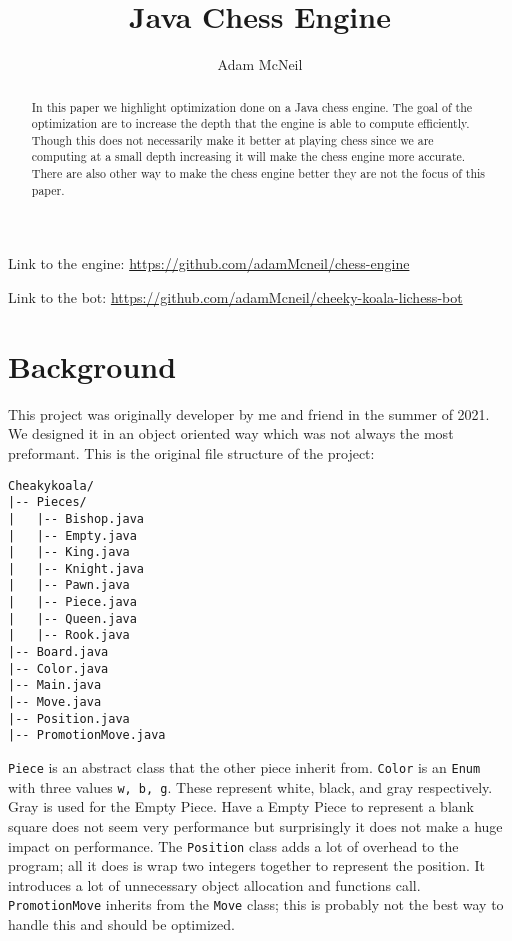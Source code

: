 \documentclass[sigconf]{acmart}
\begin{document}
\title{Java Chess Engine}

\author{Adam McNeil}


\begin{abstract}
In this paper we highlight optimization done on a Java chess engine.
The goal of the optimization are to increase the depth that the engine is able to compute efficiently.
Though this does not necessarily make it better at playing chess since we are computing at a small depth increasing it will make the chess engine more accurate.
There are also other way to make the chess engine better they are not the focus of this paper.
\end{abstract}

\maketitle
Link to the engine: \url{https://github.com/adamMcneil/chess-engine}

Link to the bot: \url{https://github.com/adamMcneil/cheeky-koala-lichess-bot}
\section{Background}
This project was originally developer by me and friend in the summer of 2021.
We designed it in an object oriented way which was not always the most preformant.
This is the original file structure of the project:
\begin{verbatim}
Cheakykoala/
|-- Pieces/
|   |-- Bishop.java
|   |-- Empty.java
|   |-- King.java
|   |-- Knight.java
|   |-- Pawn.java
|   |-- Piece.java
|   |-- Queen.java
|   |-- Rook.java
|-- Board.java
|-- Color.java
|-- Main.java
|-- Move.java
|-- Position.java
|-- PromotionMove.java
\end{verbatim}
\texttt{Piece} is an abstract class that the other piece inherit from.
\texttt{Color} is an \texttt{Enum} with three values \texttt{w, b, g}.
These represent white, black, and gray respectively.
Gray is used for the Empty Piece.
Have a Empty Piece to represent a blank square does not seem very performance but surprisingly it does not make a huge impact on performance.
The \texttt{Position} class adds a lot of overhead to the program; all it does is wrap two integers together to represent the position.
It introduces a lot of unnecessary object allocation and functions call.
\texttt{PromotionMove} inherits from the \texttt{Move} class; this is probably not the best way to handle this and should be optimized.
\end{document}

